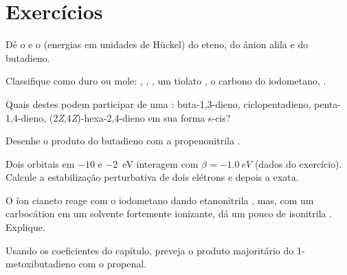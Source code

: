 \section{Exercícios}

\begin{exercise}[$\star$]\label{exo:b2:frontier-orbitals:1}
Dê o  e o  (energias em unidades de Hückel) do eteno, do ânion alila e
do butadieno.
\end{exercise}

\begin{exercise}[$\star$]\label{exo:b2:frontier-orbitals:2}
Classifique como duro ou mole: , , , um tiolato , o
carbono do iodometano, .
\end{exercise}

\begin{exercise}[$\star$]\label{exo:b2:frontier-orbitals:3}
Quais destes  podem participar de uma :
buta-1,3-dieno, ciclopentadieno, penta-1,4-dieno, (2\textit{Z},4\textit{Z})-hexa-2,4-dieno em sua
forma s-cis?
\end{exercise}

\begin{exercise}[$\star$]\label{exo:b2:frontier-orbitals:4}
Desenhe o produto do butadieno com a propenonitrila .
\end{exercise}

\begin{exercise}[$\star\star$]\label{exo:b2:frontier-orbitals:5}
Dois orbitais em $-10$ e \qty{-2}{eV} interagem com $\beta = \qty{-1.0}{eV}$ (dados do exercício).
Calcule a estabilização perturbativa de dois elétrons e depois a exata.
\end{exercise}

\begin{exercise}[$\star\star$]\label{exo:b2:frontier-orbitals:6}
O íon cianeto reage com o iodometano dando etanonitrila , mas, com um
carbocátion em um solvente fortemente ionizante, dá um pouco de isonitrila
. Explique.
\end{exercise}

\begin{exercise}[$\star\star$]\label{exo:b2:frontier-orbitals:7}
Usando os coeficientes do capítulo, preveja o produto majoritário do
1-metoxibutadieno com o propenal.
\end{exercise}

